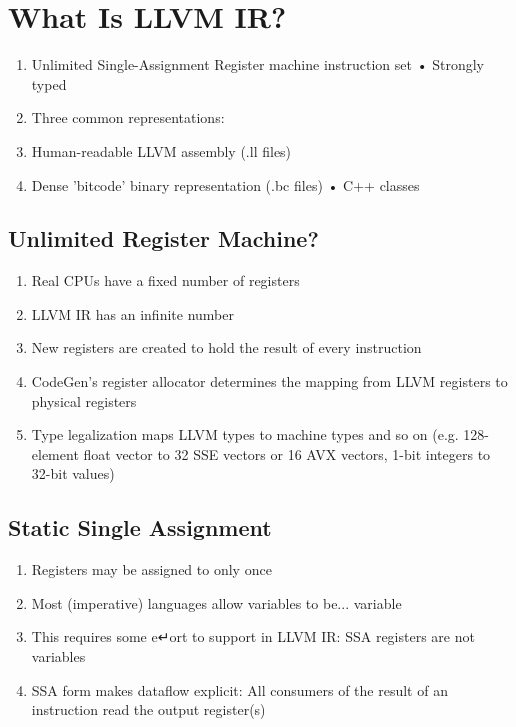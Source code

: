\documentclass[a4paper]{exam}
\theoremstyle{definition}
\begin{document}
\section{What Is LLVM IR?}
\begin{enumerate}
  \item Unlimited Single-Assignment Register machine instruction set • Strongly typed
  \item Three common representations:
  \item Human-readable LLVM assembly (.ll files)
  \item Dense 'bitcode' binary representation (.bc files) • C++ classes
\end{enumerate}

\subsection{Unlimited Register Machine?}

\begin{enumerate}
  \item  Real CPUs have a fixed number of registers
  \item LLVM IR has an infinite number
  \item New registers are created to hold the result of every instruction
  \item CodeGen's register allocator determines the mapping from LLVM registers to physical registers
  \item Type legalization maps LLVM types to machine types and so on (e.g. 128-element float vector to 32 SSE vectors or 16 AVX vectors, 1-bit integers to 32-bit values)
\end{enumerate}

\subsection{Static Single Assignment}
\begin{enumerate}
  \item Registers may be assigned to only once
  \item Most (imperative) languages allow variables to be... variable
  \item This requires some e↵ort to support in LLVM IR: SSA registers are not variables
  \item SSA form makes dataflow explicit: All consumers of the result of an instruction read the output register(s)
\end{enumerate}
\end{document}

